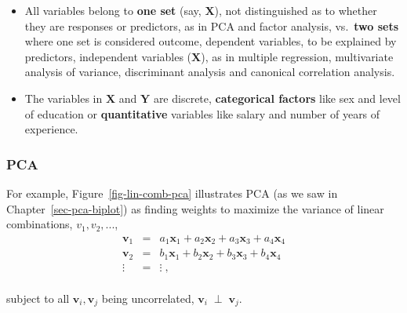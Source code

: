 \documentclass[
  letterpaper,
  10pt,
  krantz2]{krantz}
\begin{document}
\begin{itemize}
\item
  All variables belong to \textbf{one set} (say, \(\mathbf{X}\)), not
  distinguished as to whether they are responses or predictors, as in
  PCA and factor analysis, vs.~\textbf{two sets} where one set is
  considered outcome, dependent variables, to be explained by
  predictors, independent variables (\(\mathbf{X}\)), as in multiple
  regression, multivariate analysis of variance, discriminant analysis
  and canonical correlation analysis.
\item
  The variables in \(\mathbf{X}\) and \(\mathbf{Y}\) are discrete,
  \textbf{categorical factors} like sex and level of education or
  \textbf{quantitative} variables like salary and number of years of
  experience.
\end{itemize}

\subsubsection*{PCA}\label{pca}

For example, Figure~\ref{fig-lin-comb-pca} illustrates PCA (as we saw in
Chapter~\ref{sec-pca-biplot}) as finding weights to maximize the
variance of linear combinations, \(v_1, v_2, ...\), \begin{eqnarray*}
\mathbf{v}_1 & = & a_1 \mathbf{x}_1 + a_2 \mathbf{x}_2 + a_3 \mathbf{x}_3 + a_4 \mathbf{x}_4 \\
\mathbf{v}_2 & = & b_1 \mathbf{x}_1 + b_2 \mathbf{x}_2 + b_3 \mathbf{x}_3 + b_4 \mathbf{x}_4 \\
\vdots & = & \vdots \; , \\
\end{eqnarray*}

subject to all \(\mathbf{v}_i, \mathbf{v}_j\) being uncorrelated,
\(\mathbf{v}_i \;\perp\; \mathbf{v}_j\).
\end{document}
